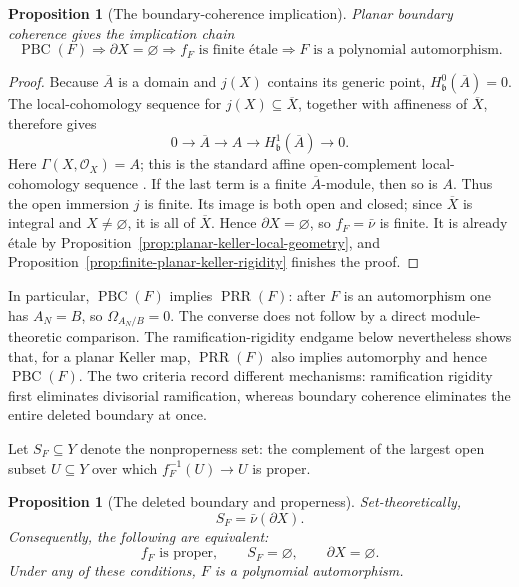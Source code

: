 \documentclass[11pt]{article}
\newtheorem{proposition}[theorem]{Proposition}
\theoremstyle{remark}
\theoremstyle{definition}
\begin{document}
\begin{proposition}[The boundary-coherence implication]
\label{prop:planar-boundary-coherence-route}
Planar boundary coherence gives the implication chain
\[
  \operatorname{PBC}(F)
  \Longrightarrow
  \partial X=\varnothing
  \Longrightarrow
  f_F\text{ is finite \'{e}tale}
  \Longrightarrow
  F\text{ is a polynomial automorphism}.
\]
\end{proposition}

\begin{proof}
Because \(\overline A\) is a domain and \(j(X)\) contains its generic point,
\(H^0_{\mathfrak b}(\overline A)=0\).  The local-cohomology sequence for
\(j(X)\subseteq\overline X\), together with affineness of \(\overline X\),
therefore gives
\[
  0\longrightarrow\overline A
  \longrightarrow A
  \longrightarrow H^1_{\mathfrak b}(\overline A)
  \longrightarrow0.
\]
Here \(\Gamma(X,\mathcal O_X)=A\); this is the standard affine
open-complement local-cohomology sequence
\cite{StacksLocalCohomologySequence}.
If the last term is a finite \(\overline A\)-module, then so is \(A\).
Thus the open immersion \(j\) is finite.  Its image is both open and closed;
since \(\overline X\) is integral and \(X\neq\varnothing\), it is all of
\(\overline X\).  Hence \(\partial X=\varnothing\), so
\(f_F=\bar\nu\) is finite.  It is already \'{e}tale by
Proposition~\ref{prop:planar-keller-local-geometry}, and
Proposition~\ref{prop:finite-planar-keller-rigidity} finishes the proof.
\end{proof}

In particular, \(\operatorname{PBC}(F)\) implies
\(\operatorname{PRR}(F)\): after \(F\) is an automorphism one has
\(A_N=B\), so \(\Omega_{A_N/B}=0\).  The converse does not follow by a
direct module-theoretic comparison.  The ramification-rigidity endgame below
nevertheless shows that, for a planar Keller map, \(\operatorname{PRR}(F)\)
also implies automorphy and hence \(\operatorname{PBC}(F)\).  The two
criteria record different mechanisms: ramification rigidity first eliminates
divisorial ramification, whereas boundary coherence eliminates the entire
deleted boundary at once.

Let \(S_F\subseteq Y\) denote the nonproperness set: the complement of
the largest open subset \(U\subseteq Y\) over which
\(f_F^{-1}(U)\to U\) is proper.

\begin{proposition}[The deleted boundary and properness]
\label{prop:planar-boundary-properness}
Set-theoretically,
\[
  S_F=\bar\nu(\partial X).
\]
Consequently, the following are equivalent:
\[
  f_F\text{ is proper},
  \qquad
  S_F=\varnothing,
  \qquad
  \partial X=\varnothing.
\]
Under any of these conditions, \(F\) is a polynomial automorphism.
\end{proposition}
\end{document}
